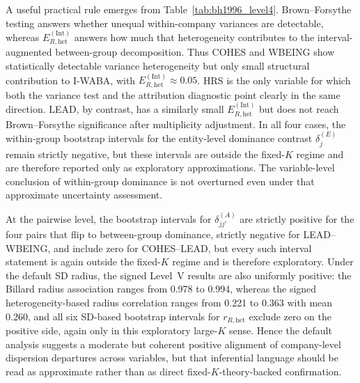 \documentclass[preprint, times, 12pt, authoryear]{elsarticle}
\begin{document}
A useful practical rule emerges from Table~\ref{tab:bh1996_level4}. Brown--Forsythe testing answers whether unequal within-company variances are detectable, whereas $E_{R,\mathrm{het}}^{(\mathrm{Int})}$ answers how much that heterogeneity contributes to the interval-augmented between-group decomposition. Thus COHES and WBEING show statistically detectable variance heterogeneity but only small structural contribution to I-WABA, with $E_{R,\mathrm{het}}^{(\mathrm{Int})}\approx 0.05$. HRS is the only variable for which both the variance test and the attribution diagnostic point clearly in the same direction. LEAD, by contrast, has a similarly small $E_{R,\mathrm{het}}^{(\mathrm{Int})}$ but does not reach Brown--Forsythe significance after multiplicity adjustment. In all four cases, the within-group bootstrap intervals for the entity-level dominance contrast $\delta_j^{(E)}$ remain strictly negative, but these intervals are outside the fixed-$K$ regime and are therefore reported only as exploratory approximations. The variable-level conclusion of within-group dominance is not overturned even under that approximate uncertainty assessment.

At the pairwise level, the bootstrap intervals for $\delta_{jj'}^{(A)}$ are strictly positive for the four pairs that flip to between-group dominance, strictly negative for LEAD--WBEING, and include zero for COHES--LEAD, but every such interval statement is again outside the fixed-$K$ regime and is therefore exploratory. Under the default SD radius, the signed Level~V results are also uniformly positive: the Billard radius association ranges from 0.978 to 0.994, whereas the signed heterogeneity-based radius correlation ranges from 0.221 to 0.363 with mean 0.260, and all six SD-based bootstrap intervals for $r_{R,\mathrm{het}}$ exclude zero on the positive side, again only in this exploratory large-$K$ sense. Hence the default analysis suggests a moderate but coherent positive alignment of company-level dispersion departures across variables, but that inferential language should be read as approximate rather than as direct fixed-$K$-theory-backed confirmation.
\end{document}
